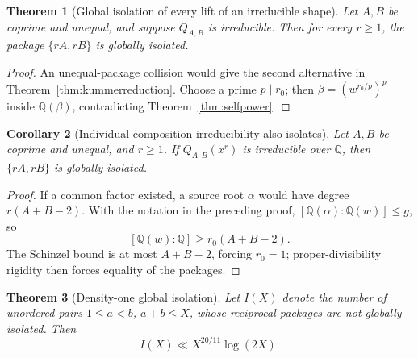 \documentclass[11pt]{article}
\numberwithin{equation}{section}
\newtheorem{theorem}{Theorem}[section]
\newtheorem{corollary}[theorem]{Corollary}
\theoremstyle{definition}
\newcommand{\Q}{\mathbb Q}
\begin{document}
\begin{theorem}[Global isolation of every lift of an irreducible shape]
\label{thm:allliftsisolated}
Let \(A,B\) be coprime and unequal, and suppose \(Q_{A,B}\) is irreducible.
Then for every \(r\geq1\), the package \(\{rA,rB\}\) is globally isolated.
\end{theorem}

\begin{proof}
An unequal-package collision would give the second alternative in
Theorem~\ref{thm:kummerreduction}.  Choose a prime \(p\mid r_0\); then
\(\beta=(w^{r_0/p})^p\) inside \(\Q(\beta)\), contradicting
Theorem~\ref{thm:selfpower}.
\end{proof}

\begin{corollary}[Individual composition irreducibility also isolates]
\label{cor:individualirreducible}
Let \(A,B\) be coprime and unequal, and \(r\geq1\).  If
\(Q_{A,B}(x^r)\) is irreducible over \(\Q\), then \(\{rA,rB\}\) is
globally isolated.
\end{corollary}

\begin{proof}
If a common factor existed, a source root \(\alpha\) would have degree
\(r(A+B-2)\).  With the notation in the preceding proof,
\([\Q(\alpha):\Q(w)]\leq g\), so
\[
 [\Q(w):\Q]\geq r_0(A+B-2).
\]
The Schinzel bound is at most \(A+B-2\), forcing \(r_0=1\); proper-divisibility
rigidity then forces equality of the packages.
\end{proof}

\begin{theorem}[Density-one global isolation]
\label{thm:densityisolation}
Let \(I(X)\) denote the number of unordered pairs \(1\leq a<b\),
\(a+b\leq X\), whose reciprocal packages are not globally isolated.  Then
\begin{equation}
 I(X)\ll X^{20/11}\log(2X).
 \label{eq:14-10}
\end{equation}
\end{theorem}
\end{document}

